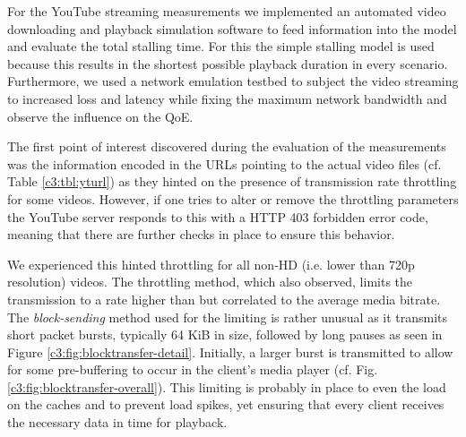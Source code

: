 For the YouTube streaming measurements we implemented an automated video downloading and playback simulation software to feed information into the model and evaluate the total stalling time. For this the simple stalling model is used because this results in the shortest possible playback duration in every scenario. Furthermore, we used a network emulation testbed to subject the video streaming to increased loss and latency while fixing the maximum network bandwidth and observe the influence on the QoE.

The first point of interest discovered during the evaluation of the measurements was the information encoded in the URLs pointing to the actual video files (cf. Table \ref{c3:tbl:yturl}) as they hinted on the presence of transmission rate throttling for some videos. However, if one tries to alter or remove the throttling parameters the YouTube server responds to this with a HTTP 403 forbidden error code, meaning that there are further checks in place to ensure this behavior. 

We experienced this hinted throttling for all non-HD (i.e. lower than 720p resolution) videos. The throttling method, which \cite{alcock2011afcyt} also observed, limits the transmission to a rate higher than but correlated to the average media bitrate. The \textit{block-sending} method used for the limiting is rather unusual as it transmits short packet bursts, typically 64 KiB in size, followed by long pauses as seen in Figure \ref{c3:fig:blocktransfer-detail}. Initially, a larger burst is transmitted to allow for some pre-buffering to occur in the client's media player (cf. Fig. \ref{c3:fig:blocktransfer-overall}). This limiting is probably in place to even the load on the caches and to prevent load spikes, yet ensuring that every client receives the necessary data in time for playback.




